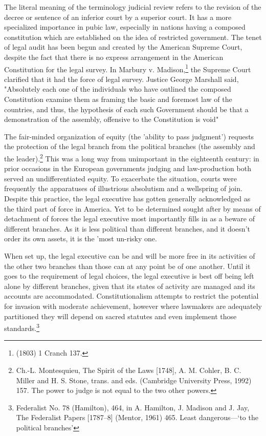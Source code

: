 \begin{multicols}{2}
\noi
The literal meaning of the terminology judicial review refers to the revision of the decree or
sentence of an inferior court by a superior court. It has a more specialized importance in
pubic law, especially in nations having a composed constitution which are established on the
idea of restricted government. The tenet of legal audit has been begun and created by the
American Supreme Court, despite the fact that there is no express arrangement in the
American Constitution for the legal survey. In Marbury v. Madison,\footnote{(1803) 1 Cranch 137.} the Supreme Court
clarified that it had the force of legal survey. Justice George Marshall said, "Absolutely each
one of the individuals who have outlined the composed Constitution examine them as
framing the basic and foremost law of the countries, and thus, the hypothesis of each such
Government should be that a demonstration of the assembly, offensive to the Constitution is
void"

\vspace{.02cm}

\noi
The fair-minded organization of equity (the 'ability to pass judgment') requests the protection
of the legal branch from the political branches (the assembly and the leader).\footnote{Ch.-L. Montesquieu, The Spirit of the Laws [1748], A. M. Cohler, B. C. Miller and H. S. Stone, trans. and eds. (Cambridge University Press, 1992) 157. The power to judge is not equal to the two other powers.} This was a
long way from unimportant in the eighteenth century: in prior occasions in the European
governments judging and law-production both served an undifferentiated equity. To
exacerbate the situation, courts were frequently the apparatuses of illustrious absolutism and
a wellspring of join. Despite this practice, the legal executive has gotten generally
acknowledged as the third part of force in America. Yet to be determined sought after by
means of detachment of forces the legal executive most importantly fills in as a beware of
different branches. As it is less political than different branches, and it doesn't order its own
assets, it is the 'most un-risky one.

\vspace{.02cm}

\noi
When set up, the legal executive can be and will be more free in its activities of the other two
branches than those can at any point be of one another. Until it goes to the requirement of
legal choices, the legal executive is best off being left alone by different branches, given that
its states of activity are managed and its accounts are accommodated. Constitutionalism
attempts to restrict the potential for invasion with moderate achievement, however where 
lawmakers are adequately partitioned they will depend on sacred statutes and even implement
those standards.\footnote{Federalist No. 78 (Hamilton), 464, in A. Hamilton, J. Madison and J. Jay, The Federalist Papers [1787–8] (Mentor, 1961) 465. Least dangerous—‘to the political branches’}


\end{multicols}
